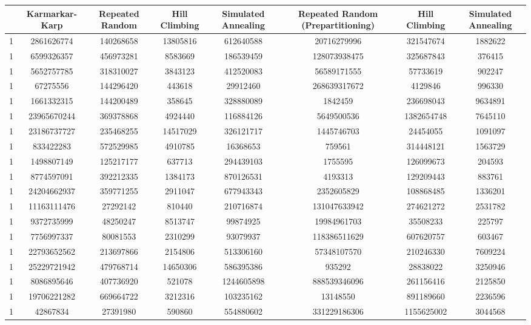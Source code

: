 \documentclass[solution, letterpaper]{cs121}
\begin{document}
\begin{center}
\begin{tabular}{ c |c c c c c c c}
   & Karmarkar-Karp & Repeated Random & Hill Climbing & Simulated Annealing & Repeated Random (Prepartitioning) & Hill Climbing & Simulated Annealing  \\
   \hline
1 & 2861626774 & 140268658 & 13805816 & 612640588 & 20716279996 & 321547674 & 1882622 \\
1 & 6599326357 & 456973281 & 8583669 & 186539459 & 128073938475 & 325687843 & 376415 \\
1 & 5652757785 & 318310027 & 3843123 & 412520083 & 56589171555 & 57733619 & 902247 \\
1 & 67275556 & 144296420 & 443618 & 29912460 & 268639317672 & 4129846 & 996330 \\
1 & 1661332315 & 144200489 & 358645 & 328880089 & 1842459 & 236698043 & 9634891 \\
1 & 23965670244 & 369378868 & 4924440 & 116884126 & 5649500536 & 1382654748 & 7645110 \\
1 & 23186737727 & 235468255 & 14517029 & 326121717 & 1445746703 & 24454055 & 1091097 \\
1 & 833422283 & 572529985 & 4910785 & 16368653 & 759561 & 314448121 & 1563729 \\
1 & 1498807149 & 125217177 & 637713 & 294439103 & 1755595 & 126099673 & 204593 \\
1 & 8774597091 & 392212335 & 1384173 & 870126531 & 4193313 & 129209443 & 883761 \\
1 & 24204662937 & 359771255 & 2911047 & 677943343 & 2352605829 & 108868485 & 1336201 \\
1 & 11163111476 & 27292142 & 810440 & 210716874 & 131047633942 & 274621272 & 2531782 \\
1 & 9372735999 & 48250247 & 8513747 & 99874925 & 19984961703 & 35508233 & 225797 \\
1 & 7756997337 & 80081553 & 2310299 & 93079937 & 118386511629 & 607620757 & 603467 \\
1 & 22793652562 & 213697866 & 2154806 & 513306160 & 57348107570 & 210246330 & 7609224 \\
1 & 25229721942 & 479768714 & 14650306 & 586395386 & 935292 & 28838022 & 3250946 \\
1 & 8086895646 & 407736920 & 521078 & 1244605898 & 888539346096 & 261156416 & 2125850 \\
1 & 19706221282 & 669664722 & 3212316 & 103235162 & 13148550 & 891189660 & 2236596 \\
1 & 42867834 & 27391980 & 590860 & 554880602 & 331229186306 & 1155625002 & 3044568 \\

\end{tabular}
\end{center}
\end{document}
